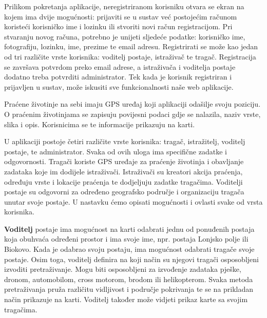 		Prilikom pokretanja aplikacije, neregistriranom korisniku otvara se ekran na kojem ima dvije mogućnosti: prijaviti se u sustav već postojećim računom koristeći korisničko ime i lozinku ili stvoriti novi račun registracijom. Pri stvaranju novog računa, potrebno je unijeti sljedeće podatke: korisničko ime, fotografiju, lozinku, ime, prezime te email adresu. Registrirati se može kao jedan od tri različite vrste korisnika: voditelj postaje, istraživač te tragač. Registracija se završava potvrdom preko email adrese, a istraživača i voditelja postaje dodatno treba potvrditi administrator. Tek kada je korisnik registriran i prijavljen u sustav, može iskusiti sve funkcionalnosti naše web aplikacije.\newline
		
		Praćene životinje na sebi imaju GPS uređaj koji aplikaciji odašilje svoju poziciju. O praćenim životinjama se zapisuju povijesni podaci gdje se nalazila, naziv vrste, slika i opis. Korisnicima se te informacije prikazuju na karti. \newline
		
		U aplikaciji postoje četiri različite vrste korisnika: tragač, istražitelj, voditelj postaje, te administrator. Svaka od ovih uloga ima specifične zadatke i odgovornosti. Tragači koriste GPS uređaje za praćenje životinja i obavljanje zadataka koje im dodijele istraživači. Istraživači su kreatori akcija praćenja, određuju vrste i lokacije praćenja te dodjeljuju zadatke tragačima. Voditelji postaje su odgovorni za određeno geografsko područje i organizaciju tragača unutar svoje postaje. U nastavku ćemo opisati mogućnosti i ovlasti svake od vrsta korisnika. \newline
		
		\textbf{Voditelj} postaje ima mogućnost na karti odabrati jednu od ponuđenih postaja koja obuhvaća određeni prostor i ima svoje ime, npr. postaja Lonjsko polje ili Biokovo. Kada je odabrao svoju postaju, ima mogućnost odabrati tragače svoje postaje. Osim toga, voditelj definira na koji način su njegovi tragači osposobljeni izvoditi pretraživanje. Mogu biti osposobljeni za izvođenje zadataka pješke, dronom, automobilom, cross motorom, brodom ili helikopterom. Svaka metoda pretraživanja pruža različitu vidljivost i područje pokrivanja te se na prikladan način prikazuje na karti. Voditelj također može vidjeti prikaz karte sa svojim tragačima. \newline
		

